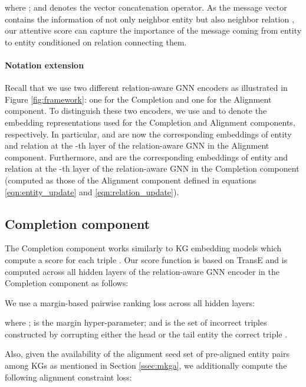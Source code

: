 \documentclass[11pt]{article}
\begin{document}
\noindent where ;  and  denotes the vector concatenation operator. As the message vector  contains the information of not only neighbor entity  but also neighbor relation , our attentive score  can capture the importance of the message coming from entity  to entity  conditioned on relation  connecting them. 


\paragraph{Notation extension} Recall that we use two different relation-aware GNN encoders as illustrated in Figure \ref{fig:framework}: one for the Completion and one for the Alignment component. To distinguish these two encoders, we use   and  to denote the embedding representations used for the Completion and Alignment components, respectively. In particular,  and  are now the corresponding embeddings of entity  and relation  at the -th layer of the relation-aware GNN in the Alignment component. Furthermore,  and  are the corresponding embeddings of entity  and relation  at the -th layer of the relation-aware GNN in the Completion component (computed as those of the Alignment component defined in equations \ref{eqn:entity_update} and \ref{eqn:relation_update}). 

\subsection{Completion component}\label{ssec:completion}

The Completion component  works similarly to KG embedding models \cite{Nguyen2020KGC,Ji_2021} which compute a score  for each triple . Our score function  is based on  TransE \cite{bordes2013translating} and is computed across all hidden layers of the relation-aware GNN encoder in the Completion component as follows:



We use a margin-based pairwise ranking loss \cite{bordes2013translating} across all hidden layers:

{\small

}

\noindent where ;  is the margin hyper-parameter; and  is the set of incorrect triples constructed by corrupting either the head or the tail entity the correct triple .

Also, given the availability of the alignment seed set  of pre-aligned entity pairs  among KGs as mentioned in Section \ref{ssec:mkga}, we additionally compute the following alignment constraint loss:
\end{document}
